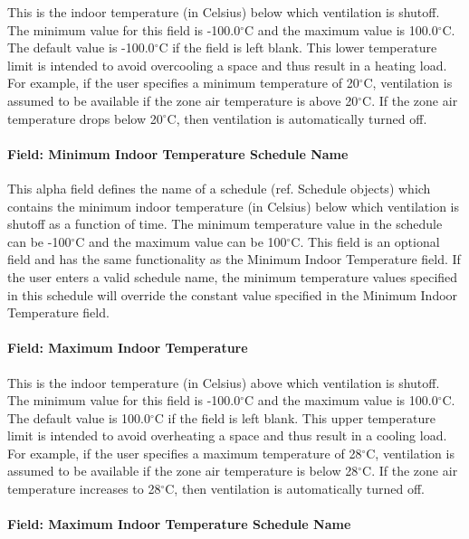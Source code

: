 This is the indoor temperature (in Celsius) below which ventilation is shutoff. The minimum value for this field is -100.0$^\circ$C and the maximum value is 100.0$^\circ$C. The default value is -100.0$^\circ$C if the field is left blank. This lower temperature limit is intended to avoid overcooling a space and thus result in a heating load. For example, if the user specifies a minimum temperature of 20$^\circ$C, ventilation is assumed to be available if the zone air temperature is above 20$^\circ$C. If the zone air temperature drops below 20$^\circ$C, then ventilation is automatically turned off.

\paragraph{Field: Minimum Indoor Temperature Schedule Name}\label{field-minimum-indoor-temperature-schedule-name}

This alpha field defines the name of a schedule (ref. Schedule objects) which contains the minimum indoor temperature (in Celsius) below which ventilation is shutoff as a function of time. The minimum temperature value in the schedule can be -100$^\circ$C and the maximum value can be 100$^\circ$C. This field is an optional field and has the same functionality as the Minimum Indoor Temperature field. If the user enters a valid schedule name, the minimum temperature values specified in this schedule will override the constant value specified in the Minimum Indoor Temperature field.

\paragraph{Field: Maximum Indoor Temperature}\label{field-maximum-indoor-temperature}

This is the indoor temperature (in Celsius) above which ventilation is shutoff. The minimum value for this field is -100.0$^\circ$C and the maximum value is 100.0$^\circ$C. The default value is 100.0$^\circ$C if the field is left blank. This upper temperature limit is intended to avoid overheating a space and thus result in a cooling load. For example, if the user specifies a maximum temperature of 28$^\circ$C, ventilation is assumed to be available if the zone air temperature is below 28$^\circ$C. If the zone air temperature increases to 28$^\circ$C, then ventilation is automatically turned off.

\paragraph{Field: Maximum Indoor Temperature Schedule Name}\label{field-maximum-indoor-temperature-schedule-name}

